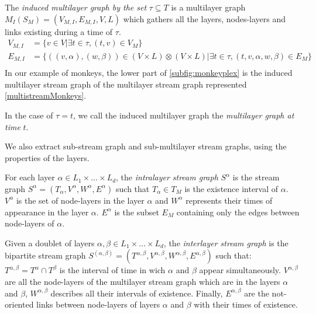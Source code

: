 \documentclass{svproc}
\begin{document}
\begin{definition}
    The {\em induced multilayer graph by the set } $\tau \subseteq T$ is a multilayer graph $M_I(S_M)=(V_{M,I}, E_{M,I}, V,L)$ which gathers all the layers, nodes-layers and links existing during a time of $\tau$.
    \begin{align*}
    	V_{M,I} & = \{ v \in V | \exists t \in \tau, (t,v) \in V_M\}\\
    	E_{M,I} & = \{((v,\alpha),(w,\beta)) \in (V\times L)\otimes (V\times L) | \exists t \in \tau , (t,v,\alpha,w,\beta) \in E_M \} \\
    \end{align*}
    In our example of monkeys, the lower part of \cref{subfig:monkeyplex} is the induced multilayer stream graph of the multilayer stream graph represented \cref{multistreamMonkeys}.
\end{definition}

In the case of $\tau={t}$, we call the induced multilayer graph the {\em multilayer graph at time} $t$.

We also extract sub-stream graph and sub-multilayer stream graphs, using the properties of the layers.

\begin{definition}
	For each layer $\alpha \in L_1 \times \dots \times L_d$, the {\em intralayer stream graph} $S^{\alpha}$ is the stream graph $S^{\alpha}=(T_{\alpha},V^{\alpha},W^{\alpha},E^{\alpha})$ such that $ T_{\alpha} \in T_M$ is the existence interval of $\alpha$. $V^{\alpha}$ is the set of node-layers in the layer $\alpha$ and $W^{\alpha}$ represents their times of appearance in the layer $\alpha$. $E^{\alpha}$ is the subset $E_M$ containing only the edges between node-layers of $\alpha$.
	\end{definition}


	\begin{definition}
	Given a doublet of layers $\alpha, \beta \in L_1\times \dots\times L_d$, the {\em interlayer stream graph} is the bipartite stream graph $S^{(\alpha,\beta)} = (T^{\alpha,\beta}, V^{\alpha,\beta},W^{\alpha,\beta},E^{\alpha,\beta})$ such that: $T^{\alpha,\beta}=T^{\alpha}\cap T^{\beta}$ is the interval of time in wich $\alpha$ and $\beta$ appear simultaneously. $V^{\alpha,\beta}$ are all the node-layers of the multilayer stream graph which are in the layers $\alpha$ and $\beta$, $W^{\alpha,\beta}$ describes all their intervals of existence. Finally, $E^{\alpha,\beta}$ are the not-oriented links between node-layers of layers $\alpha$ and $\beta$ with their times of existence.
	\end{definition}
\end{document}
